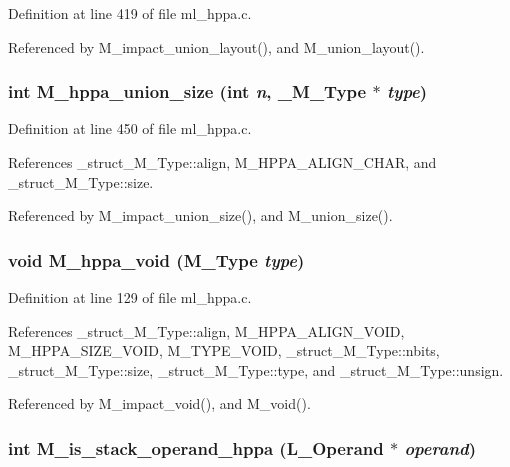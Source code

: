 Definition at line 419 of file ml\_\-hppa.c.

Referenced by M\_\-impact\_\-union\_\-layout(), and M\_\-union\_\-layout().
\subsubsection{\setlength{\rightskip}{0pt plus 5cm}int M\_\-hppa\_\-union\_\-size (int {\em n}, \bf{\_\-M\_\-Type} $\ast$ {\em type})}\label{m__hppa_8h_6804446577d2d774d162829565cdada6}




Definition at line 450 of file ml\_\-hppa.c.

References \_\-struct\_\-M\_\-Type::align, M\_\-HPPA\_\-ALIGN\_\-CHAR, and \_\-struct\_\-M\_\-Type::size.

Referenced by M\_\-impact\_\-union\_\-size(), and M\_\-union\_\-size().
\subsubsection{\setlength{\rightskip}{0pt plus 5cm}void M\_\-hppa\_\-void (\bf{M\_\-Type} {\em type})}\label{m__hppa_8h_d5eb60de6f2b92ee6d4a106ad96a2f79}




Definition at line 129 of file ml\_\-hppa.c.

References \_\-struct\_\-M\_\-Type::align, M\_\-HPPA\_\-ALIGN\_\-VOID, M\_\-HPPA\_\-SIZE\_\-VOID, M\_\-TYPE\_\-VOID, \_\-struct\_\-M\_\-Type::nbits, \_\-struct\_\-M\_\-Type::size, \_\-struct\_\-M\_\-Type::type, and \_\-struct\_\-M\_\-Type::unsign.

Referenced by M\_\-impact\_\-void(), and M\_\-void().
\subsubsection{\setlength{\rightskip}{0pt plus 5cm}int M\_\-is\_\-stack\_\-operand\_\-hppa (L\_\-Operand $\ast$ {\em operand})}\label{m__hppa_8h_e9ac64bbabc572e56d9e4b5306c0745a}




